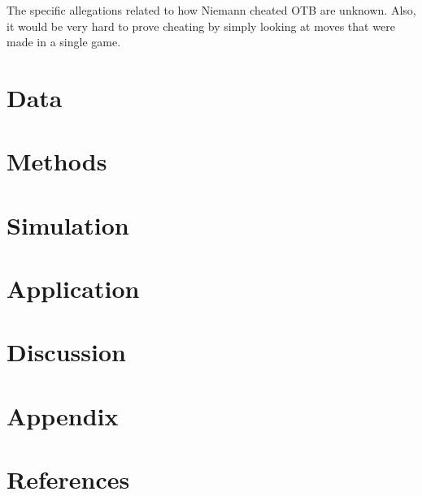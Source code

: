 \documentclass[12pt]{article}
\begin{document}
The specific allegations related to how Niemann cheated OTB are unknown. Also, it would be very hard to prove cheating by simply looking at moves that were made in a single game.

\section*{Data}
\label{sec:data}


\section*{Methods}
\label{sec:meth}

\section*{Simulation}
\label{sec:sim}


\section*{Application}
\label{sec:app}

\section*{Discussion}
\label{sec:disc}

\section*{Appendix}
\label{sec:appx}

\section*{References}
\label{sec:refs}
\end{document}
